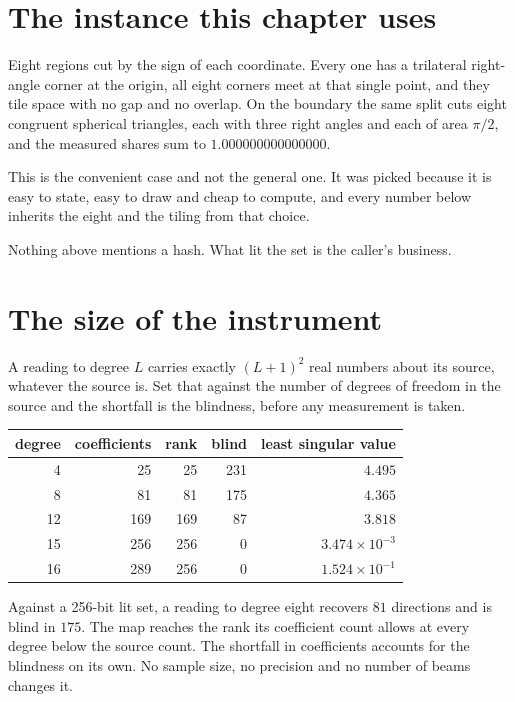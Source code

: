 \section{The instance this chapter uses}

Eight regions cut by the sign of each coordinate. Every one has a trilateral right-angle corner at the origin, all eight corners meet at that single point, and they tile space with no gap and no overlap. On the boundary the same split cuts eight congruent spherical triangles, each with three right angles and each of area \(\pi/2\), and the measured shares sum to \(1.000000000000000\).

This is the convenient case and not the general one. It was picked because it is easy to state, easy to draw and cheap to compute, and every number below inherits the eight and the tiling from that choice.

Nothing above mentions a hash. What lit the set is the caller's business.

\section{The size of the instrument}

A reading to degree \(L\) carries exactly \((L+1)^2\) real numbers about its source, whatever the source is. Set that against the number of degrees of freedom in the source and the shortfall is the blindness, before any measurement is taken.

\begin{center}
\begin{tabular}{@{}rrrrr@{}}
\toprule
degree & coefficients & rank & blind & least singular value \\
\midrule
4 & 25 & 25 & 231 & \(4.495\) \\
8 & 81 & 81 & 175 & \(4.365\) \\
12 & 169 & 169 & 87 & \(3.818\) \\
15 & 256 & 256 & 0 & \(3.474 \times 10^{-3}\) \\
16 & 289 & 256 & 0 & \(1.524 \times 10^{-1}\) \\
\bottomrule
\end{tabular}
\end{center}

Against a 256-bit lit set, a reading to degree eight recovers \(81\) directions and is blind in \(175\). The map reaches the rank its coefficient count allows at every degree below the source count. The shortfall in coefficients accounts for the blindness on its own. No sample size, no precision and no number of beams changes it.

